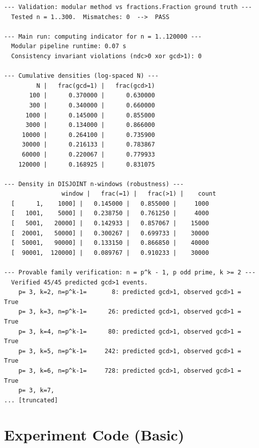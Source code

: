 \documentclass[11pt]{article}
\begin{document}
\begin{lstlisting}
--- Validation: modular method vs fractions.Fraction ground truth ---
  Tested n = 1..300.  Mismatches: 0  -->  PASS

--- Main run: computing indicator for n = 1..120000 ---
  Modular pipeline runtime: 0.07 s
  Consistency invariant violations (ndc>0 xor gcd>1): 0

--- Cumulative densities (log-spaced N) ---
         N |   frac(gcd=1) |   frac(gcd>1)
       100 |      0.370000 |      0.630000
       300 |      0.340000 |      0.660000
      1000 |      0.145000 |      0.855000
      3000 |      0.134000 |      0.866000
     10000 |      0.264100 |      0.735900
     30000 |      0.216133 |      0.783867
     60000 |      0.220067 |      0.779933
    120000 |      0.168925 |      0.831075

--- Density in DISJOINT n-windows (robustness) ---
                window |   frac(=1) |   frac(>1) |    count
  [      1,    1000] |   0.145000 |   0.855000 |     1000
  [   1001,    5000] |   0.238750 |   0.761250 |     4000
  [   5001,   20000] |   0.142933 |   0.857067 |    15000
  [  20001,   50000] |   0.300267 |   0.699733 |    30000
  [  50001,   90000] |   0.133150 |   0.866850 |    40000
  [  90001,  120000] |   0.089767 |   0.910233 |    30000

--- Provable family verification: n = p^k - 1, p odd prime, k >= 2 ---
  Verified 45/45 predicted gcd>1 events.
    p= 3, k=2, n=p^k-1=       8: predicted gcd>1, observed gcd>1 = True
    p= 3, k=3, n=p^k-1=      26: predicted gcd>1, observed gcd>1 = True
    p= 3, k=4, n=p^k-1=      80: predicted gcd>1, observed gcd>1 = True
    p= 3, k=5, n=p^k-1=     242: predicted gcd>1, observed gcd>1 = True
    p= 3, k=6, n=p^k-1=     728: predicted gcd>1, observed gcd>1 = True
    p= 3, k=7, 
... [truncated]
\end{lstlisting}


\section{Experiment Code (Basic)}
\end{document}
